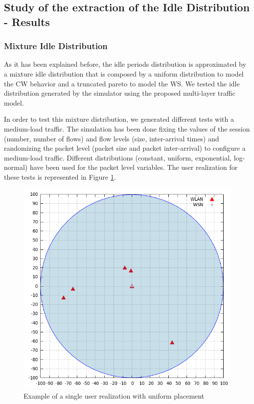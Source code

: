 \subsection{Study of the extraction of the Idle Distribution - Results} \label{sec:idle-results}

\subsubsection{Mixture Idle Distribution} \label{subsec:mixture}
As it has been explained before, the idle periods distribution is approximated by a mixture idle distribution that is composed by a uniform distribution to model the \acs{CW} behavior and a truncated pareto to model the \acs{WS}. We tested the idle distribution generated by the simulator using the proposed multi-layer traffic model.

In order to test this mixture distribution, we generated different tests with a medium-load traffic. The simulation has been done fixing the values of the session (number, number of flows) and flow levels (size, inter-arrival times) and randomizing the packet level (packet size and packet inter-arrival) to configure a medium-load traffic. Different distributions (constant, uniform, exponential, log-normal) have been used for the packet level variables. The user realization for these tests is represented in Figure \ref{fig:test_model_network}.

\begin{figure}[h!]
	\centering
	\includegraphics[scale=0.30]{images/results/GlobalView/test_model_network}
	\caption{Example of a single user realization with uniform placement}
	\label{fig:test_model_network}
\end{figure}

